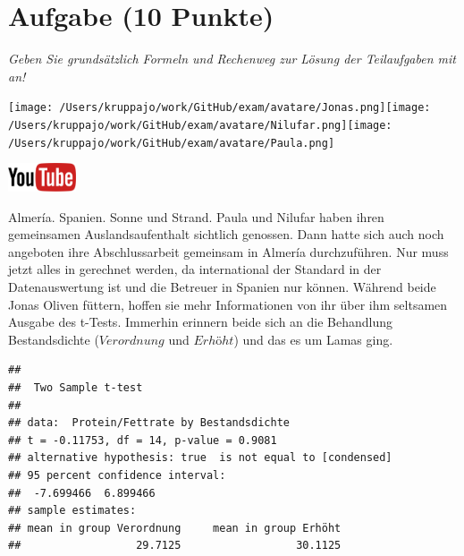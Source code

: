 \documentclass[a4paper, 9pt]{scrartcl}\usepackage[]{graphicx}\usepackage[]{xcolor}
\makeatletter
\newenvironment{kframe}{%
 \def\at@end@of@kframe{}%
 \ifinner\ifhmode%
  \def\at@end@of@kframe{\end{minipage}}%
  \begin{minipage}{\columnwidth}%
 \fi\fi%
 \def\FrameCommand##1{\hskip\@totalleftmargin \hskip-\fboxsep
 \colorbox{shadecolor}{##1}\hskip-\fboxsep
     \hskip-\linewidth \hskip-\@totalleftmargin \hskip\columnwidth}%
 \MakeFramed {\advance\hsize-\width
   \@totalleftmargin\z@ \linewidth\hsize
   \@setminipage}}%
 {\par\unskip\endMakeFramed%
 \at@end@of@kframe}
\newenvironment{knitrout}{}{} %
\makeatother
\begin{document}
 
\clearpage

\section{Aufgabe \hfill (10 Punkte)}

\textit{Geben Sie grundsätzlich Formeln und Rechenweg zur Lösung der Teilaufgaben mit an!} \\[1Ex]
 

 
\begin{minipage}[t]{0.5\textwidth}
\texttt{[image: /Users/kruppajo/work/GitHub/exam/avatare/Jonas.png]}\hspace{-4mm}\texttt{[image: /Users/kruppajo/work/GitHub/exam/avatare/Nilufar.png]}\hspace{-4mm}\texttt{[image: /Users/kruppajo/work/GitHub/exam/avatare/Paula.png]}
\end{minipage}
\begin{minipage}[t]{0.5\textwidth}
\hfill
\href{https://youtu.be/exDo7AyHl4Q}{\includegraphics[width = 2cm]{img/youtube}}
\end{minipage}
\vspace{1ex}



Almería. Spanien. Sonne und Strand. Paula und Nilufar haben ihren gemeinsamen Auslandsaufenthalt sichtlich genossen. Dann hatte sich auch noch angeboten ihre Abschlussarbeit gemeinsam in Almería durchzuführen. Nur muss jetzt alles in \Rlogo gerechnet werden, da \Rlogo international der Standard in der Datenauswertung ist und die Betreuer in Spanien nur \Rlogo können. Während beide Jonas Oliven füttern, hoffen sie mehr Informationen von ihr über ihm seltsamen \Rlogo Ausgabe des t-Tests. Immerhin erinnern beide sich an die Behandlung Bestandsdichte ($Verordnung$ und $Erhöht$) und das es um Lamas ging.

\begin{knitrout}
\color{fgcolor}\begin{kframe}
\begin{verbatim}
## 
## 	Two Sample t-test
## 
## data:  Protein/Fettrate by Bestandsdichte
## t = -0.11753, df = 14, p-value = 0.9081
## alternative hypothesis: true  is not equal to [condensed]
## 95 percent confidence interval:
##  -7.699466  6.899466
## sample estimates:
## mean in group Verordnung     mean in group Erhöht 
##                  29.7125                  30.1125
\end{verbatim}
\end{kframe}
\end{knitrout}
\end{document}
